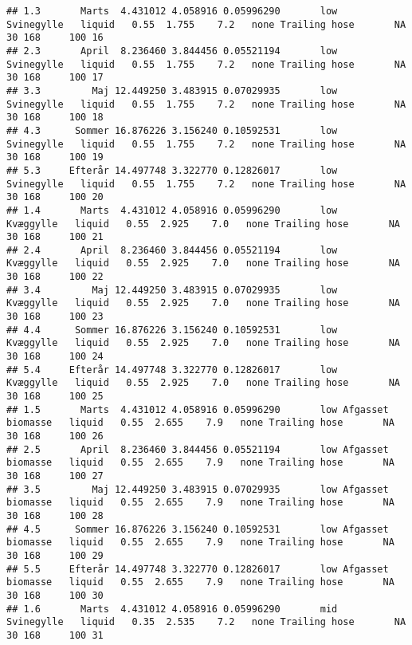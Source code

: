 \documentclass[
  landscape]{article}
\begin{document}
\begin{verbatim}
## 1.3       Marts  4.431012 4.058916 0.05996290       low        Svinegylle   liquid   0.55  1.755    7.2   none Trailing hose       NA          30 168     100 16
## 2.3       April  8.236460 3.844456 0.05521194       low        Svinegylle   liquid   0.55  1.755    7.2   none Trailing hose       NA          30 168     100 17
## 3.3         Maj 12.449250 3.483915 0.07029935       low        Svinegylle   liquid   0.55  1.755    7.2   none Trailing hose       NA          30 168     100 18
## 4.3      Sommer 16.876226 3.156240 0.10592531       low        Svinegylle   liquid   0.55  1.755    7.2   none Trailing hose       NA          30 168     100 19
## 5.3     Efterår 14.497748 3.322770 0.12826017       low        Svinegylle   liquid   0.55  1.755    7.2   none Trailing hose       NA          30 168     100 20
## 1.4       Marts  4.431012 4.058916 0.05996290       low         Kvæggylle   liquid   0.55  2.925    7.0   none Trailing hose       NA          30 168     100 21
## 2.4       April  8.236460 3.844456 0.05521194       low         Kvæggylle   liquid   0.55  2.925    7.0   none Trailing hose       NA          30 168     100 22
## 3.4         Maj 12.449250 3.483915 0.07029935       low         Kvæggylle   liquid   0.55  2.925    7.0   none Trailing hose       NA          30 168     100 23
## 4.4      Sommer 16.876226 3.156240 0.10592531       low         Kvæggylle   liquid   0.55  2.925    7.0   none Trailing hose       NA          30 168     100 24
## 5.4     Efterår 14.497748 3.322770 0.12826017       low         Kvæggylle   liquid   0.55  2.925    7.0   none Trailing hose       NA          30 168     100 25
## 1.5       Marts  4.431012 4.058916 0.05996290       low Afgasset biomasse   liquid   0.55  2.655    7.9   none Trailing hose       NA          30 168     100 26
## 2.5       April  8.236460 3.844456 0.05521194       low Afgasset biomasse   liquid   0.55  2.655    7.9   none Trailing hose       NA          30 168     100 27
## 3.5         Maj 12.449250 3.483915 0.07029935       low Afgasset biomasse   liquid   0.55  2.655    7.9   none Trailing hose       NA          30 168     100 28
## 4.5      Sommer 16.876226 3.156240 0.10592531       low Afgasset biomasse   liquid   0.55  2.655    7.9   none Trailing hose       NA          30 168     100 29
## 5.5     Efterår 14.497748 3.322770 0.12826017       low Afgasset biomasse   liquid   0.55  2.655    7.9   none Trailing hose       NA          30 168     100 30
## 1.6       Marts  4.431012 4.058916 0.05996290       mid        Svinegylle   liquid   0.35  2.535    7.2   none Trailing hose       NA          30 168     100 31

\end{verbatim}
\end{document}
